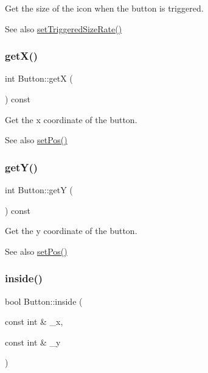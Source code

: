 Get the size of the icon when the button is triggered. 

\begin{DoxySeeAlso}{See also}
\mbox{\hyperlink{class_button_a632e041a4c2f31df0930b6024ffa7f3e}{set\+Triggered\+Size\+Rate()}} 
\end{DoxySeeAlso}
\mbox{\label{class_button_a05c6aae1cf037ad66e3821963fe72988}} 
\subsubsection{\texorpdfstring{get\+X()}{getX()}}
{\footnotesize\ttfamily int Button\+::getX (\begin{DoxyParamCaption}{ }\end{DoxyParamCaption}) const\hspace{0.3cm}{\ttfamily [inline]}}



Get the x coordinate of the button. 

\begin{DoxySeeAlso}{See also}
\mbox{\hyperlink{class_button_a2a68b92dff42182822d4be189fc3cca6}{set\+Pos()}} 
\end{DoxySeeAlso}
\mbox{\label{class_button_a3acf216100c43b999e38047bfdf99ee7}} 
\subsubsection{\texorpdfstring{get\+Y()}{getY()}}
{\footnotesize\ttfamily int Button\+::getY (\begin{DoxyParamCaption}{ }\end{DoxyParamCaption}) const\hspace{0.3cm}{\ttfamily [inline]}}



Get the y coordinate of the button. 

\begin{DoxySeeAlso}{See also}
\mbox{\hyperlink{class_button_a2a68b92dff42182822d4be189fc3cca6}{set\+Pos()}} 
\end{DoxySeeAlso}
\mbox{\label{class_button_ad7ac1018e71492e734ec0eae2d800d24}} 
\subsubsection{\texorpdfstring{inside()}{inside()}}
{\footnotesize\ttfamily bool Button\+::inside (\begin{DoxyParamCaption}\item[{const int \&}]{\+\_\+x,  }\item[{const int \&}]{\+\_\+y }\end{DoxyParamCaption})\hspace{0.3cm}{\ttfamily [inline]}}



